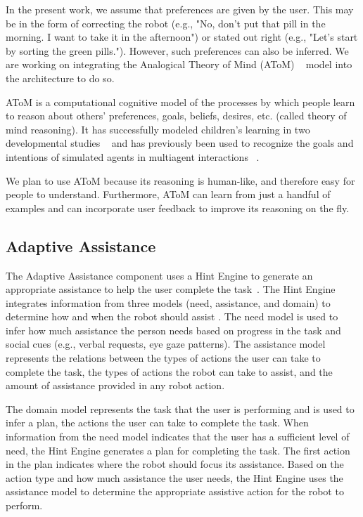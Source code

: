 \documentclass[letterpaper]{article} %
\begin{document}
In the present work, we assume that preferences are given by the user. This may be in the form of correcting the robot (e.g., "No, don't put that pill in the morning. I want to take it in the afternoon") or stated out right (e.g., "Let's start by sorting the green pills."). However, such preferences can also be inferred. We are working on integrating the Analogical Theory of Mind (AToM) ~\cite{rabkina2017towards} model into the architecture to do so.

AToM is a computational cognitive model of the processes by which people learn to reason about others' preferences, goals, beliefs, desires, etc. (called theory of mind reasoning). It has successfully modeled children's learning in two developmental studies ~\cite{rabkina2017towards,rabkina2018bootstrapping} and has previously been used to recognize the goals and intentions of simulated agents in multiagent interactions ~\cite{rabkina2019analogical,rabkina2020acs}.

We plan to use AToM because its reasoning is human-like, and therefore easy for people to understand. Furthermore, AToM can learn from just a handful of examples and can incorporate user feedback to improve its reasoning on the fly.

\subsection{Adaptive Assistance}

The Adaptive Assistance component uses a Hint Engine to generate an appropriate assistance to help the user complete the task~\cite{wilson2018general}.  The Hint Engine integrates information from three models (need, assistance, and domain) to determine how and when the robot should assist \cite{wilson2019developing}.  The need model is used to infer how much assistance the person needs based on progress in the task and social cues (e.g., verbal requests, eye gaze patterns).  The assistance model represents the relations between the types of actions the user can take to complete the task, the types of actions the robot can take to assist, and the amount of assistance provided in any robot action.

The domain model represents the task that the user is performing and is used to infer a plan, the actions the user can take to complete the task.  When information from the need model indicates that the user has a sufficient level of need, the Hint Engine generates a plan for completing the task.  The first action in the plan indicates where the robot should focus its assistance.  Based on the action type and how much assistance the user needs, the Hint Engine uses the assistance model to determine the appropriate assistive action for the robot to perform.
\end{document}

